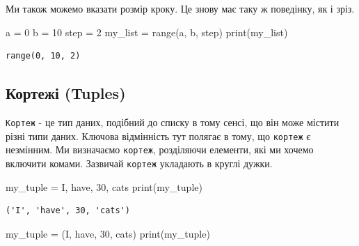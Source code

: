 \documentclass[
  letterpaper,
]{report}
\newenvironment{Shaded}{\begin{snugshade}}{\end{snugshade}}
\newcommand{\BuiltInTok}[1]{\textcolor[rgb]{0.00,0.23,0.31}{#1}}
\newcommand{\DecValTok}[1]{\textcolor[rgb]{0.68,0.00,0.00}{#1}}
\newcommand{\NormalTok}[1]{\textcolor[rgb]{0.00,0.23,0.31}{#1}}
\newcommand{\OperatorTok}[1]{\textcolor[rgb]{0.37,0.37,0.37}{#1}}
\newcommand{\StringTok}[1]{\textcolor[rgb]{0.13,0.47,0.30}{#1}}
\begin{document}
Ми також можемо вказати розмір кроку. Це знову має таку ж поведінку, як
і зріз.

\begin{Shaded}
\begin{Highlighting}[]
\NormalTok{a }\OperatorTok{=} \DecValTok{0}
\NormalTok{b }\OperatorTok{=} \DecValTok{10}
\NormalTok{step }\OperatorTok{=} \DecValTok{2}
\NormalTok{my\_list }\OperatorTok{=} \BuiltInTok{range}\NormalTok{(a, b, step)}
\BuiltInTok{print}\NormalTok{(my\_list)}
\end{Highlighting}
\end{Shaded}

\begin{verbatim}
range(0, 10, 2)
\end{verbatim}

\hypertarget{ux43aux43eux440ux442ux435ux436ux456-tuples}{%
\subsection{Кортежі
(Tuples)}\label{ux43aux43eux440ux442ux435ux436ux456-tuples}}

\texttt{Кортеж} - це тип даних, подібний до списку в тому сенсі, що він
може містити різні типи даних. Ключова відмінність тут полягає в тому,
що \texttt{кортеж} є незмінним. Ми визначаємо \texttt{кортеж},
розділяючи елементи, які ми хочемо включити комами. Зазвичай
\texttt{кортеж} укладають в круглі дужки.

\begin{Shaded}
\begin{Highlighting}[]
\NormalTok{my\_tuple }\OperatorTok{=} \StringTok{\textquotesingle{}I\textquotesingle{}}\NormalTok{, }\StringTok{\textquotesingle{}have\textquotesingle{}}\NormalTok{, }\DecValTok{30}\NormalTok{, }\StringTok{\textquotesingle{}cats\textquotesingle{}}
\BuiltInTok{print}\NormalTok{(my\_tuple)}
\end{Highlighting}
\end{Shaded}

\begin{verbatim}
('I', 'have', 30, 'cats')
\end{verbatim}

\begin{Shaded}
\begin{Highlighting}[]
\NormalTok{my\_tuple }\OperatorTok{=}\NormalTok{ (}\StringTok{\textquotesingle{}I\textquotesingle{}}\NormalTok{, }\StringTok{\textquotesingle{}have\textquotesingle{}}\NormalTok{, }\DecValTok{30}\NormalTok{, }\StringTok{\textquotesingle{}cats\textquotesingle{}}\NormalTok{)}
\BuiltInTok{print}\NormalTok{(my\_tuple)}
\end{Highlighting}
\end{Shaded}
\end{document}
